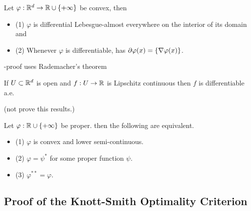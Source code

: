 \documentclass[10pt,a4paper]{article}
\renewenvironment{i}
{\begin{itemize} 
	}%
	{\end{itemize}
}
\begin{document}
 Let $\varphi : \mathbb{R}^d \rightarrow \mathbb{R} \cup \{+\infty \}$ be convex, then
\begin{i}
\item[(1)] $\varphi$ is differential Lebesgue-almost everywhere on the interior of its domain and
\item[(2)] Whenever $\varphi$ is differentiable, has $\partial \varphi(x) = \{\nabla \varphi(x) \}$.
\end{i}
-proof uses Rademacher's theorem
\s

 If $U\subset \mathbb{R}^d$ is open and $f:U\rightarrow \mathbb{R}$ is Lipschitz continuous then $f$ is differentiable a.e.

(not prove this results.)
\s

 Let $\varphi : \mathbb{R} \cup \{+\infty \}$ be proper. then the following are equivalent.
\begin{i}
\item[(1)] $\varphi$ is convex and lower semi-continuous.
\item[(2)] $\varphi = \psi^*$ for some proper function $\psi$.
\item[(3)] $\varphi^{**} = \varphi$.
\end{i}

\subsection{Proof of the Knott-Smith Optimality Criterion}
\end{document}
